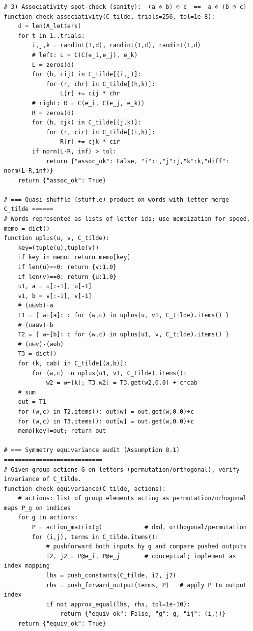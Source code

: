 \documentclass[10pt]{article}
\begin{document}
\begin{lstlisting}
# 3) Associativity spot-check (sanity):  (a ⊙ b) ⊙ c  ==  a ⊙ (b ⊙ c)
function check_associativity(C_tilde, trials=256, tol=1e-8):
    d = len(A_letters)
    for t in 1..trials:
        i,j,k = randint(1,d), randint(1,d), randint(1,d)
        # left: L = C(C(e_i,e_j), e_k)
        L = zeros(d)
        for (h, cij) in C_tilde[(i,j)]:
            for (r, chr) in C_tilde[(h,k)]:
                L[r] += cij * chr
        # right: R = C(e_i, C(e_j, e_k))
        R = zeros(d)
        for (h, cjk) in C_tilde[(j,k)]:
            for (r, cir) in C_tilde[(i,h)]:
                R[r] += cjk * cir
        if norm(L-R, inf) > tol:
            return {"assoc_ok": False, "i":i,"j":j,"k":k,"diff": norm(L-R,inf)}
    return {"assoc_ok": True}

# === Quasi-shuffle (stuffle) product on words with letter-merge C_tilde ======
# Words represented as lists of letter ids; use memoization for speed.
memo = dict()
function uplus(u, v, C_tilde):
    key=(tuple(u),tuple(v))
    if key in memo: return memo[key]
    if len(u)==0: return {v:1.0}
    if len(v)==0: return {u:1.0}
    u1, a = u[:-1], u[-1]
    v1, b = v[:-1], v[-1]
    # (u⊎vb)·a
    T1 = { w+[a]: c for (w,c) in uplus(u, v1, C_tilde).items() }
    # (ua⊎v)·b
    T2 = { w+[b]: c for (w,c) in uplus(u1, v, C_tilde).items() }
    # (u⊎v)·(a⊙b)
    T3 = dict()
    for (k, cab) in C_tilde[(a,b)]:
        for (w,c) in uplus(u1, v1, C_tilde).items():
            w2 = w+[k]; T3[w2] = T3.get(w2,0.0) + c*cab
    # sum
    out = T1
    for (w,c) in T2.items(): out[w] = out.get(w,0.0)+c
    for (w,c) in T3.items(): out[w] = out.get(w,0.0)+c
    memo[key]=out; return out

# === Symmetry equivariance audit (Assumption 8.1) ============================
# Given group actions G on letters (permutation/orthogonal), verify invariance of C_tilde.
function check_equivariance(C_tilde, actions):
    # actions: list of group elements acting as permutation/orhogonal maps P_g on indices
    for g in actions:
        P = action_matrix(g)            # dxd, orthogonal/permutation
        for (i,j), terms in C_tilde.items():
            # pushforward both inputs by g and compare pushed outputs
            i2, j2 = P@e_i, P@e_j       # conceptual; implement as index mapping
            lhs = push_constants(C_tilde, i2, j2)
            rhs = push_forward_output(terms, P)   # apply P to output index
            if not approx_equal(lhs, rhs, tol=1e-10):
                return {"equiv_ok": False, "g": g, "ij": (i,j)}
    return {"equiv_ok": True}


\end{lstlisting}
\end{document}
